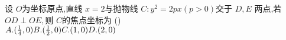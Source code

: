 \documentclass[class=ctexart,crop=false]{standalone}
\begin{document}
设 $O$为坐标原点,直线 $x=2$与抛物线 $C:y^2=2px(p>0)$交于 $D,E$
两点,若 $OD \perp OE,$则 $C$的焦点坐标为 \hfill (\qquad)\\
$A. (\frac{1}{4},0)\hfill B. (\frac{1}{2},0)\hfill 
 C. (1,0)\hfill D. (2,0)\hfill \quad \\ $
\end{document}
